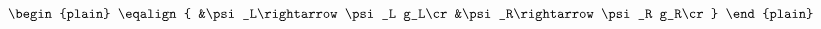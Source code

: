 \begin{equation}
\begin{plain}
\eqalign{
&\psi_L\rightarrow \psi_L g_L\cr
&\psi_R\rightarrow \psi_R g_R\cr
}
\end{plain}
\end{equation} 
